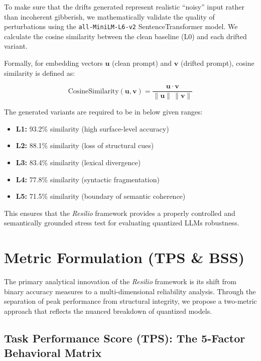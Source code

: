 \documentclass[conference]{IEEEtran}
\begin{document}
To make sure that the drifts generated represent realistic ``noisy'' input rather than incoherent gibberish, we mathematically validate the quality of perturbations using the \texttt{all-MiniLM-L6-v2} SentenceTransformer model. We calculate the cosine similarity between the clean baseline (L0) and each drifted variant.

Formally, for embedding vectors $\mathbf{u}$ (clean prompt) and $\mathbf{v}$ (drifted prompt), cosine similarity is defined as:

\begin{equation}
\text{CosineSimilarity}(\mathbf{u}, \mathbf{v}) =
\frac{\mathbf{u} \cdot \mathbf{v}}{\|\mathbf{u}\| \, \|\mathbf{v}\|}
\end{equation}

The generated variants are required to be in below given ranges:

\begin{itemize}
\item \textbf{L1:} 93.2\% similarity (high surface-level accuracy)
\item \textbf{L2:} 88.1\% similarity (loss of structural cues)
\item \textbf{L3:} 83.4\% similarity (lexical divergence)
\item \textbf{L4:} 77.8\% similarity (syntactic fragmentation)
\item \textbf{L5:} 71.5\% similarity (boundary of semantic coherence)
\end{itemize}

This ensures that the \textit{Resilio} framework provides a properly controlled and semantically grounded stress test for evaluating quantized LLMs robustness.





\section{Metric Formulation (TPS \& BSS)}

The primary analytical innovation of the \textit{Resilio} framework is its shift from binary accuracy measures to a multi-dimensional reliability analysis. Through the separation of peak performance from structural integrity, we propose a two-metric approach that reflects the nuanced breakdown of quantized models.

\subsection{Task Performance Score (TPS): The 5-Factor Behavioral Matrix}
\end{document}

